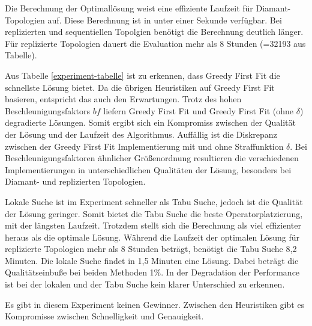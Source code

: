 \documentclass{article}
\begin{document}
Die Berechnung der Optimallösung weist eine effiziente Laufzeit für Diamant-Topologien auf. 
Diese Berechnung ist in unter einer Sekunde verfügbar. Bei replizierten und sequentiellen Topolgien benötigt die Berechnung deutlich länger. 
Für replizierte Topologien dauert die Evaluation mehr als 8 Stunden (=32193 aus Tabelle).

Aus Tabelle \ref{experiment-tabelle} ist zu erkennen, dass Greedy First Fit die schnellste Lösung bietet. 
Da die übrigen Heuristiken auf Greedy First Fit basieren, entspricht das auch den Erwartungen. 
Trotz des hohen Beschleunigungsfaktors $bf$ liefern Greedy First Fit und Greedy First Fit (ohne $\delta$) degradierte Lösungen. 
Somit ergibt sich ein Kompromiss zwischen der Qualität der Lösung und der Laufzeit des Algorithmus. 
Auffällig ist die Diskrepanz zwischen der Greedy First Fit Implementierung mit und ohne Straffunktion $\delta$. 
Bei Beschleunigungsfaktoren ähnlicher Größenordnung resultieren die verschiedenen Implementierungen 
in unterschiedlichen Qualitäten der Lösung, besonders bei Diamant- und replizierten Topologien.

Lokale Suche ist im Experiment schneller als Tabu Suche, jedoch ist die Qualität der Lösung geringer. 
Somit bietet die Tabu Suche die beste Operatorplatzierung, mit der längsten Laufzeit. 
Trotzdem stellt sich die Berechnung als viel effizienter heraus als die optimale Lösung. 
Während die Laufzeit der optimalen Lösung für replizierte Topologien mehr als 8 Stunden beträgt, benötigt die Tabu Suche 8,2 Minuten. 
Die lokale Suche findet in 1,5 Minuten eine Lösung. Dabei beträgt die Qualitätseinbuße bei beiden Methoden 1\%. 
In der Degradation der Performance ist bei der lokalen und der Tabu Suche kein klarer Unterschied zu erkennen. 

Es gibt in diesem Experiment keinen Gewinner. Zwischen den Heuristiken gibt es Kompromisse zwischen Schnelligkeit und Genauigkeit. 
\end{document}
